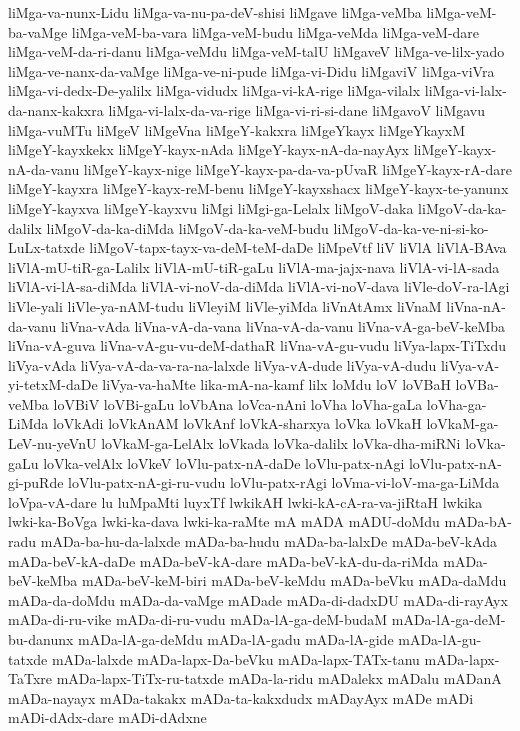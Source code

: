 {liMga-va-nunx-Lidu
liMga-va-nu-pa-deV-shisi
liMgave
liMga-veMba
liMga-veM-ba-vaMge
liMga-veM-ba-vara
liMga-veM-budu
liMga-veMda
liMga-veM-dare
liMga-veM-da-ri-danu
liMga-veMdu
liMga-veM-talU
liMgaveV
liMga-ve-lilx-yado
liMga-ve-nanx-da-vaMge
liMga-ve-ni-pude
liMga-vi-Didu
liMgaviV
liMga-viVra
liMga-vi-dedx-De-yalilx
liMga-vidudx
liMga-vi-kA-rige
liMga-vilalx
liMga-vi-lalx-da-nanx-kakxra
liMga-vi-lalx-da-va-rige
liMga-vi-ri-si-dane
liMgavoV
liMgavu
liMga-vuMTu
liMgeV
liMgeVna
liMgeY-kakxra
liMgeYkayx
liMgeYkayxM
liMgeY-kayxkekx
liMgeY-kayx-nAda
liMgeY-kayx-nA-da-nayAyx
liMgeY-kayx-nA-da-vanu
liMgeY-kayx-nige
liMgeY-kayx-pa-da-va-pUvaR
liMgeY-kayx-rA-dare
liMgeY-kayxra
liMgeY-kayx-reM-benu
liMgeY-kayxshacx
liMgeY-kayx-te-yanunx
liMgeY-kayxva
liMgeY-kayxvu
liMgi
liMgi-ga-Lelalx
liMgoV-daka
liMgoV-da-ka-dalilx
liMgoV-da-ka-diMda
liMgoV-da-ka-veM-budu
liMgoV-da-ka-ve-ni-si-ko-LuLx-tatxde
liMgoV-tapx-tayx-va-deM-teM-daDe
liMpeVtf
liV
liVlA
liVlA-BAva
liVlA-mU-tiR-ga-Lalilx
liVlA-mU-tiR-gaLu
liVlA-ma-jajx-nava
liVlA-vi-lA-sada
liVlA-vi-lA-sa-diMda
liVlA-vi-noV-da-diMda
liVlA-vi-noV-dava
liVle-doV-ra-lAgi
liVle-yali
liVle-ya-nAM-tudu
liVleyiM
liVle-yiMda
liVnAtAmx
liVnaM
liVna-nA-da-vanu
liVna-vAda
liVna-vA-da-vana
liVna-vA-da-vanu
liVna-vA-ga-beV-keMba
liVna-vA-guva
liVna-vA-gu-vu-deM-dathaR
liVna-vA-gu-vudu
liVya-lapx-TiTxdu
liVya-vAda
liVya-vA-da-va-ra-na-lalxde
liVya-vA-dude
liVya-vA-dudu
liVya-vA-yi-tetxM-daDe
liVya-va-haMte
lika-mA-na-kamf
lilx
loMdu
loV
loVBaH
loVBa-veMba
loVBiV
loVBi-gaLu
loVbAna
loVca-nAni
loVha
loVha-gaLa
loVha-ga-LiMda
loVkAdi
loVkAnAM
loVkAnf
loVkA-sharxya
loVka
loVkaH
loVkaM-ga-LeV-nu-yeVnU
loVkaM-ga-LelAlx
loVkada
loVka-dalilx
loVka-dha-miRNi
loVka-gaLu
loVka-velAlx
loVkeV
loVlu-patx-nA-daDe
loVlu-patx-nAgi
loVlu-patx-nA-gi-puRde
loVlu-patx-nA-gi-ru-vudu
loVlu-patx-rAgi
loVma-vi-loV-ma-ga-LiMda
loVpa-vA-dare
lu
luMpaMti
luyxTf
lwkikAH
lwki-kA-cA-ra-va-jiRtaH
lwkika
lwki-ka-BoVga
lwki-ka-dava
lwki-ka-raMte
mA
mADA
mADU-doMdu
mADa-bA-radu
mADa-ba-hu-da-lalxde
mADa-ba-hudu
mADa-ba-lalxDe
mADa-beV-kAda
mADa-beV-kA-daDe
mADa-beV-kA-dare
mADa-beV-kA-du-da-riMda
mADa-beV-keMba
mADa-beV-keM-biri
mADa-beV-keMdu
mADa-beVku
mADa-daMdu
mADa-da-doMdu
mADa-da-vaMge
mADade
mADa-di-dadxDU
mADa-di-rayAyx
mADa-di-ru-vike
mADa-di-ru-vudu
mADa-lA-ga-deM-budaM
mADa-lA-ga-deM-bu-danunx
mADa-lA-ga-deMdu
mADa-lA-gadu
mADa-lA-gide
mADa-lA-gu-tatxde
mADa-lalxde
mADa-lapx-Da-beVku
mADa-lapx-TATx-tanu
mADa-lapx-TaTxre
mADa-lapx-TiTx-ru-tatxde
mADa-la-ridu
mADalekx
mADalu
mADanA
mADa-nayayx
mADa-takakx
mADa-ta-kakxdudx
mADayAyx
mADe
mADi
mADi-dAdx-dare
mADi-dAdxne
}
